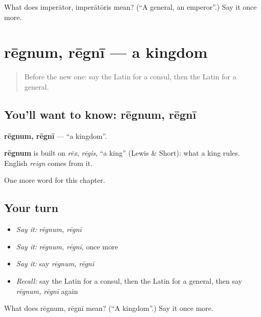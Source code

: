 \begin{tcolorbox}[breakable,colback=teal!4,colframe=teal!35!black,title={Before you move on}]
What does imperātor, imperātōris mean? (\textquotedblleft{}A general, an emperor\textquotedblright{}.) Say it once more.
\end{tcolorbox}
\section[rēgnum, rēgnī]{rēgnum, rēgnī — a kingdom}

\label{lesson:LA-C245-regnum}



\begin{quote}
Before the new one: say the Latin for a consul, then the Latin for a general.
\end{quote}

\subsection*{You'll want to know: rēgnum, rēgnī}
\textbf{rēgnum, rēgnī} — \textquotedblleft{}a kingdom\textquotedblright{}.

\begin{cousinweb}
\textbf{rēgnum} is built on \emph{rēx}, \emph{rēgis}, \textquotedblleft{}a king\textquotedblright{} (Lewis \& Short): what a king rules. English \emph{reign} comes from it.
\end{cousinweb}

\begin{grammarlens}[title={What you've built}]
One more word for this chapter.
\end{grammarlens}

\subsection*{Your turn}
\begin{itemize}
\raggedright
  \item \emph{Say it:} \emph{rēgnum, rēgnī}
  \item \emph{Say it:} \emph{rēgnum, rēgnī}, once more
  \item \emph{Say it:} say \emph{rēgnum, rēgnī}
  \item \emph{Recall:} say the Latin for a consul, then the Latin for a general, then say \emph{rēgnum, rēgnī} again
\end{itemize}

\begin{tcolorbox}[breakable,colback=teal!4,colframe=teal!35!black,title={Before you move on}]
What does rēgnum, rēgnī mean? (\textquotedblleft{}A kingdom\textquotedblright{}.) Say it once more.
\end{tcolorbox}
